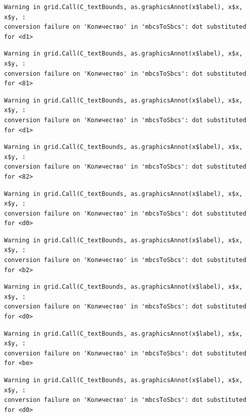 \documentclass[
  letterpaper,
  DIV=11,
  numbers=noendperiod]{scrreprt}
\theoremstyle{definition}
\theoremstyle{remark}
\begin{document}
\begin{verbatim}
Warning in grid.Call(C_textBounds, as.graphicsAnnot(x$label), x$x, x$y, :
conversion failure on 'Количество' in 'mbcsToSbcs': dot substituted for <d1>
\end{verbatim}

\begin{verbatim}
Warning in grid.Call(C_textBounds, as.graphicsAnnot(x$label), x$x, x$y, :
conversion failure on 'Количество' in 'mbcsToSbcs': dot substituted for <81>
\end{verbatim}

\begin{verbatim}
Warning in grid.Call(C_textBounds, as.graphicsAnnot(x$label), x$x, x$y, :
conversion failure on 'Количество' in 'mbcsToSbcs': dot substituted for <d1>
\end{verbatim}

\begin{verbatim}
Warning in grid.Call(C_textBounds, as.graphicsAnnot(x$label), x$x, x$y, :
conversion failure on 'Количество' in 'mbcsToSbcs': dot substituted for <82>
\end{verbatim}

\begin{verbatim}
Warning in grid.Call(C_textBounds, as.graphicsAnnot(x$label), x$x, x$y, :
conversion failure on 'Количество' in 'mbcsToSbcs': dot substituted for <d0>
\end{verbatim}

\begin{verbatim}
Warning in grid.Call(C_textBounds, as.graphicsAnnot(x$label), x$x, x$y, :
conversion failure on 'Количество' in 'mbcsToSbcs': dot substituted for <b2>
\end{verbatim}

\begin{verbatim}
Warning in grid.Call(C_textBounds, as.graphicsAnnot(x$label), x$x, x$y, :
conversion failure on 'Количество' in 'mbcsToSbcs': dot substituted for <d0>
\end{verbatim}

\begin{verbatim}
Warning in grid.Call(C_textBounds, as.graphicsAnnot(x$label), x$x, x$y, :
conversion failure on 'Количество' in 'mbcsToSbcs': dot substituted for <be>
\end{verbatim}

\begin{verbatim}
Warning in grid.Call(C_textBounds, as.graphicsAnnot(x$label), x$x, x$y, :
conversion failure on 'Количество' in 'mbcsToSbcs': dot substituted for <d0>
\end{verbatim}
\end{document}
